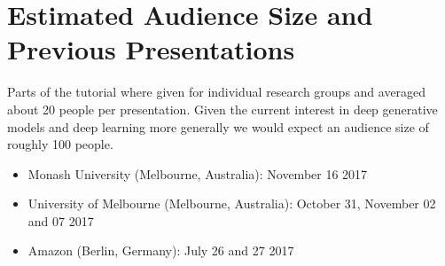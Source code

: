 \section{Estimated Audience Size and Previous Presentations}

Parts of the tutorial where given for individual research groups and averaged about 20 people per presentation. Given the current interest in deep generative models and deep learning more generally we 
would expect an audience size of roughly 100 people.

\begin{itemize}
	\item Monash University (Melbourne, Australia): November 16 2017
	\item University of Melbourne (Melbourne, Australia): October 31, November 02 and 07 2017
	\item Amazon (Berlin, Germany): July 26 and 27 2017
\end{itemize}

